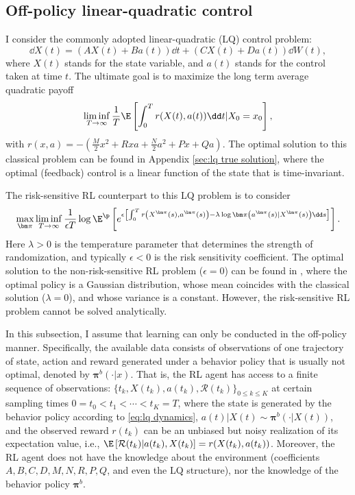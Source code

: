 \subsection{Off-policy linear-quadratic control}
I consider the commonly adopted linear-quadratic (LQ) control problem:
\begin{equation}
	\label{eq:lq dynamics}
	\dd X(t) = (AX(t) + Ba(t))\dd t + (CX(t) + D a(t))\dd W(t),
\end{equation}
where $X(t)$ stands for the state variable, and $a(t)$ stands for the control taken at time $t$. The ultimate goal is to maximize the long term average quadratic payoff
\begin{equation}
	\label{eq:lq non risk sensitive}
	\liminf_{T\to \infty}\frac{1}{T}\E\left[\int_0^T r(X(t),a(t))\dd t | X_0 = x_0 \right],
\end{equation}
with $r(x,a) = -(\frac{M}{2}x^2 + Rxa + \frac{N}{2}a^2 + Px + Qa)$. The optimal solution to this classical problem can be found in Appendix \ref{sec:lq true solution}, where the optimal (feedback) control is a linear function of the state that is time-invariant. 

The risk-sensitive RL counterpart to this LQ problem is to consider
\begin{equation}
	\label{eq:lq risk sensitive rl}
	\max_{\bm\pi}\liminf_{T\to \infty} \frac{1}{\epsilon T}\log\E^{\p}\left[ e^{\epsilon  \left[ \int_0^T r\left( X^{\bm\pi}(s), a^{\bm\pi}(s) \right) - \lambda \log\bm\pi\left(a^{\bm\pi}(s) | X^{\bm\pi}(s)\right)    \dd s \right]  } \right] .
\end{equation}
Here $\lambda > 0$ is the temperature parameter that determines the strength of randomization, and typically $\epsilon < 0$ is the risk sensitivity coefficient. The optimal solution to the non-risk-sensitive RL problem ($\epsilon = 0$) can be found in \citet[Appendix B2]{jia2022policypg}, where the optimal policy is a Gaussian distribution, whose mean coincides with the classical solution ($\lambda = 0$), and whose variance is a constant. However, the risk-sensitive RL problem cannot be solved analytically.


In this subsection, I assume that learning can only be conducted in the off-policy manner. Specifically, the available data consists of observations of one trajectory of state, action and reward generated under a behavior policy that is usually not optimal, denoted by $\bm\pi^b(\cdot|x)$. That is, the RL agent has access to a finite sequence of observations: $\{t_k,X(t_k),a(t_k),\mathcal R(t_k)\}_{0\leq k\leq K}$ at certain sampling times $0 = t_0<t_1<\cdots<t_K = T$, where the state is generated by the behavior policy according to \eqref{eq:lq dynamics}, $a(t)|X(t) \sim \bm\pi^b(\cdot| X(t))$, and the observed reward $r(t_k)$ can be an unbiased but noisy realization of its expectation value, i.e., $\E\left[ \mathcal R(t_k)|a(t_k), X(t_k) \right] = r(X(t_k), a(t_k))$. Moreover, the RL agent does not have the knowledge about the environment (coefficients $A,B,C,D,M,N,R,P,Q$, and even the LQ structure), nor the knowledge of the behavior policy $\bm\pi^b$. 

